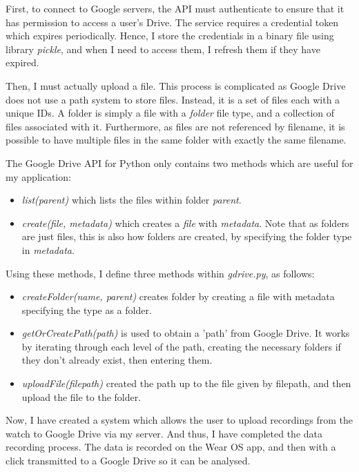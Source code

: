 \documentclass[12pt,a4paper,twoside,openright]{report}
\begin{document}
First, to connect to Google servers, the API must authenticate to ensure that
it has permission to access a user's Drive. The service requires a credential
token which expires periodically. Hence, I store the credentials in a binary
file using library \emph{pickle}, and when I need to access them, I 
refresh them if they have expired.

Then, I must actually upload a file. This process is complicated as Google
Drive does not use a path system to store files. Instead, it is a set of files
each with a unique IDs. A folder is simply a file with a \emph{folder} file
type, and a collection of files associated with it. Furthermore, as files are
not referenced by filename, it is possible to have multiple files in the same
folder with exactly the same filename.

The Google Drive API for Python only contains two methods which are useful for
my application:

\begin{itemize}
	\item \emph{list(parent)} which lists the files within folder
		\emph{parent}.

	\item \emph{create(file, metadata)} which creates a \emph{file} with
		\emph{metadata}. Note that as folders
		are just files, this is also how folders are created, by
		specifying the folder type in \emph{metadata}.
\end{itemize}

Using these methods, I define three methods within \emph{gdrive.py}, as follows:

\begin{itemize}
	\item \emph{createFolder(name, parent)} creates folder by creating a
		file with metadata specifying the type as a folder.

	\item \emph{getOrCreatePath(path)} is used to obtain a 'path' from Google
		Drive. It works by iterating through each level of the path,
		creating the necessary folders if they don't already exist,
		then entering them.

	\item \emph{uploadFile(filepath)} created the path up to the file
		given by filepath, and then upload the file to the folder.
\end{itemize}

Now, I have created a system which allows the user to upload recordings from
the watch to Google Drive via my server. And thus, I have completed the data
recording process. The data is recorded on the Wear OS app, and then with a
click transmitted to a Google Drive so it can be analysed.
\end{document}
